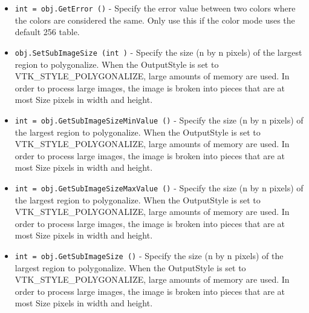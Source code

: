 \begin{itemize}
\item  \verb|int = obj.GetError ()| -  Specify the error value between two colors where the colors are 
 considered the same. Only use this if the color mode uses the
 default 256 table.

\item  \verb|obj.SetSubImageSize (int )| -  Specify the size (n by n pixels) of the largest region to 
 polygonalize. When the OutputStyle is set to VTK\_STYLE\_POLYGONALIZE,
 large amounts of memory are used. In order to process large images,
 the image is broken into pieces that are at most Size pixels in
 width and height.

\item  \verb|int = obj.GetSubImageSizeMinValue ()| -  Specify the size (n by n pixels) of the largest region to 
 polygonalize. When the OutputStyle is set to VTK\_STYLE\_POLYGONALIZE,
 large amounts of memory are used. In order to process large images,
 the image is broken into pieces that are at most Size pixels in
 width and height.

\item  \verb|int = obj.GetSubImageSizeMaxValue ()| -  Specify the size (n by n pixels) of the largest region to 
 polygonalize. When the OutputStyle is set to VTK\_STYLE\_POLYGONALIZE,
 large amounts of memory are used. In order to process large images,
 the image is broken into pieces that are at most Size pixels in
 width and height.

\item  \verb|int = obj.GetSubImageSize ()| -  Specify the size (n by n pixels) of the largest region to 
 polygonalize. When the OutputStyle is set to VTK\_STYLE\_POLYGONALIZE,
 large amounts of memory are used. In order to process large images,
 the image is broken into pieces that are at most Size pixels in
 width and height.

\end{itemize}
